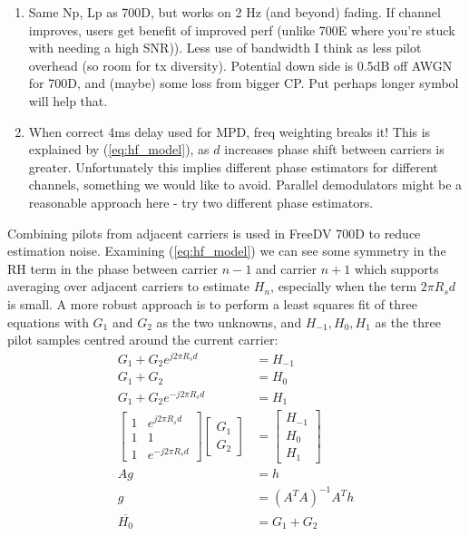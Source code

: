 \documentclass{article}
\begin{document}
\begin{enumerate}
\item Same Np, Lp as 700D, but works on 2 Hz (and beyond) fading.  If channel improves, users get benefit of improved perf (unlike 700E where you're stuck with needing a high SNR)).  Less use of bandwidth I think as less pilot overhead (so room for tx diversity). Potential down side is 0.5dB off AWGN for 700D, and (maybe) some loss from bigger CP.  Put perhaps longer symbol will help that.
\item When correct 4ms delay used for MPD, freq weighting breaks it!  This is explained by (\ref{eq:hf_model}), as $d$ increases phase shift between carriers is greater.  Unfortunately this implies different phase estimators for different channels, something we would like to avoid. Parallel demodulators might be a reasonable approach here - try two different phase estimators.
\end{enumerate}

Combining pilots from adjacent carriers is used in FreeDV 700D to reduce estimation noise.  Examining (\ref{eq:hf_model}) we can see some symmetry in the RH term in the phase between carrier $n-1$ and carrier $n+1$ which supports averaging over adjacent carriers to estimate $H_n$, especially when the term $2 \pi R_s d$ is small.  A more robust approach is to perform a least squares fit of three equations with $G_1$ and $G_2$ as the two unknowns, and $H_{-1}, H_0, H_1$ as the three pilot samples centred around the current carrier:
\begin{equation}
\label{eq:combine_freq}
\begin{split}
G_1 + G_2 e^{j 2 \pi R_sd} &= H_{-1} \\
G_1 + G_2 &= H_{0} \\
G_1 + G_2 e^{-j 2 \pi R_sd} &= H_{1} \\
\begin{bmatrix}
  1 & e^{j 2 \pi R_sd} \\
  1 & 1 \\
  1 & e^{-j 2 \pi R_sd}
\end{bmatrix} 
\begin{bmatrix}
  G_1 \\
  G_2
\end{bmatrix} 
&= \begin{bmatrix}
  H_{-1} \\
  H_{0} \\
  H_{1}
\end{bmatrix} \\
Ag &= h \\
 g &= (A^TA)^{-1}A^Th \\
 \overline{H_0} &= G_1 + G_2
\end{split}
\end{equation} 
\end{document}
